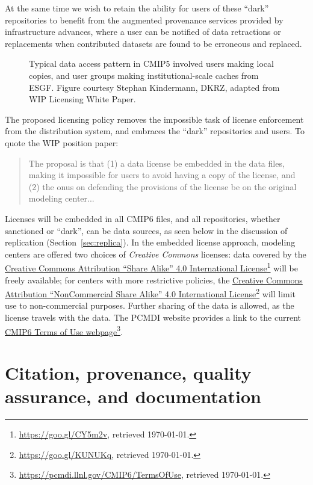 \documentclass[gmd,manuscript]{copernicus}
\newcommand{\urlref}[2] {\href{#1}{#2}\footnote{\url{#1}, retrieved \today.}}
\begin{document}
At the same time we wish to retain the ability for users of these ``dark''
repositories to benefit from the augmented provenance services provided by
infrastructure advances, where a user can be notified of data retractions or
replacements when contributed datasets are found to be
erroneous and replaced.

\begin{figure*}
  \begin{center}
  \end{center}
  \caption{Typical data access pattern in CMIP5 involved users making
    local copies, and user groups making institutional-scale caches
    from ESGF. Figure courtesy Stephan Kindermann, DKRZ, adapted from
    WIP Licensing White Paper.}
  \label{fig:dark}
\end{figure*}

The proposed licensing policy removes the impossible
task of license enforcement from the distribution system, and embraces
the ``dark'' repositories and users. To quote the WIP position paper:

\begin{quote}
  The proposal is that (1) a data license be embedded in the data
  files, making it impossible for users to avoid having a copy of the
  license, and (2) the onus on defending the provisions of the license
  be on the original modeling center...
\end{quote}

Licenses will be embedded in all CMIP6 files, and all repositories, whether
sanctioned or ``dark'', can be data sources, as seen below in the
discussion of replication (Section~\ref{sec:replica}).
In the embedded license approach, modeling centers are offered two
choices of \emph{Creative Commons} licenses: data covered by the
\urlref{https://goo.gl/CY5m2v}{Creative Commons Attribution ``Share
  Alike'' 4.0 International License} will be freely available; for
centers with more restrictive policies, the
\urlref{https://goo.gl/KUNUKq}{Creative Commons Attribution
  ``NonCommercial Share Alike'' 4.0 International License} will limit use 
to non-commercial purposes. Further sharing of the data
is allowed, as the license travels with the data. The PCMDI website
provides a link to the current
\urlref{https://pcmdi.llnl.gov/CMIP6/TermsOfUse}{CMIP6 Terms of Use
  webpage}.

\section{Citation, provenance, quality assurance, and documentation}
\label{sec:cite}
\end{document}
